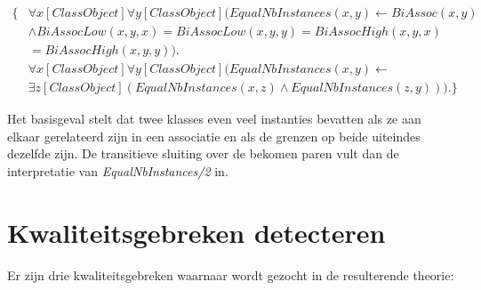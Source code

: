 \begin{align*}
	\{
	&\forall{x}[ClassObject]\forall{y}[ClassObject](EqualNbInstances(x, y) \leftarrow BiAssoc(x, y) \\ &\land BiAssocLow(x, y, x) = BiAssocLow(x, y, y) = BiAssocHigh(x, y, x) \\ &= BiAssocHigh(x, y, y)). \\
	&\forall{x}[ClassObject]\forall{y}[ClassObject](EqualNbInstances(x, y) \leftarrow \\ &\exists{z}[ClassObject](EqualNbInstances(x, z) \land EqualNbInstances(z, y))).
	\}
\end{align*}

Het basisgeval stelt dat twee klasses even veel instanties bevatten als ze aan elkaar gerelateerd zijn in een associatie en als de grenzen op beide uiteindes dezelfde zijn. De transitieve sluiting over de bekomen paren vult dan de interpretatie van \textit{EqualNbInstances/2} in.

\section{Kwaliteitsgebreken detecteren}
Er zijn drie kwaliteitsgebreken waarnaar wordt gezocht in de resulterende theorie:

